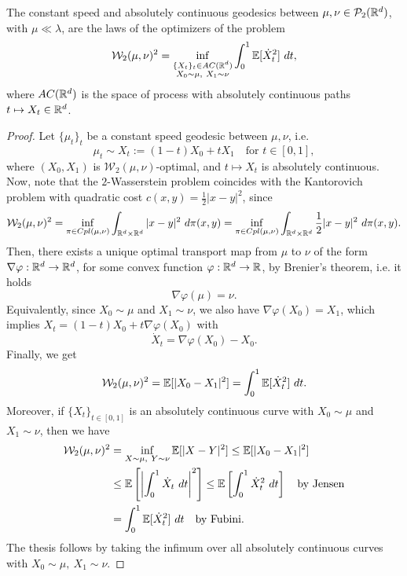 \documentclass[../main.tex]{subfiles}
\begin{document}
\begin{proposition}
    The constant speed and absolutely continuous geodesics between $\mu, \nu\in \mathcal{P}_2(\mathbb{R}^d)$, with $\mu\ll\lambda$, are the laws of the optimizers of the problem 
    $$
    \mathcal{W}_2(\mu, \nu)^2 = \inf_{\substack{\{X_t\}_t\in AC(\mathbb{R}^d) \\ X_0 \sim\mu, \ X_1\sim\nu}} \int_0^1 \mathbb{E}[\dot X_t^2] \ dt,
    $$
    where $AC(\mathbb{R}^d)$ is the space of process with absolutely continuous paths $t\mapsto X_t\in\mathbb{R}^d$. 
\end{proposition}
\begin{proof}
    Let $\{\mu_t\}_t$ be a constant speed geodesic between $\mu, \nu$, i.e.
    $$
    \mu_t \sim X_t := (1-t)X_0 + tX_1 \quad \text{for } t\in[0,1],
    $$
    where $(X_0, X_1)$ is $\mathcal{W}_2(\mu, \nu)$-optimal, and $t\mapsto X_t$ is absolutely continuous. \\
    Now, note that the $2$-Wasserstein problem coincides with the Kantorovich problem with quadratic cost $c(x, y) = \frac{1}{2}|x-y|^2$, since
    $$
    \mathcal{W}_2(\mu, \nu)^2 = \inf_{\pi\in Cpl(\mu, \nu)} \int_{\R^d\times\R^d} |x-y|^2 \ d\pi(x, y) = \inf_{\pi\in Cpl(\mu, \nu)} \int_{\R^d\times\R^d} \frac{1}{2}|x-y|^2 \ d\pi(x, y).
    $$
    Then, there exists a unique optimal transport map from $\mu$ to $\nu$ of the form $\nabla\varphi: \mathbb{R}^d \to \mathbb{R}^d$, for some convex function $\varphi: \mathbb{R}^d\to\mathbb{R}$, by Brenier's theorem, i.e. it holds $$\nabla\varphi(\mu) = \nu.$$
    Equivalently, since $X_0\sim\mu$ and $X_1\sim\nu$, we also have $\nabla\varphi(X_0) = X_1$, which implies $X_t = (1-t)X_0 +t\nabla\varphi(X_0)$ with $$\dot X_t = \nabla\varphi(X_0) - X_0.$$
    Finally, we get
    $$
    \mathcal{W}_2(\mu, \nu)^2 = \mathbb{E}[|X_0 - X_1|^2] =\int_0^1 \mathbb{E}[\dot X_t^2] \ dt.
    $$
    Moreover, if $\{X_t\}_{t\in[0,1]}$ is an absolutely continuous curve with $X_0\sim\mu$ and $X_1\sim\nu$, then we have
    \begin{align*}
        \mathcal{W}_2(\mu, \nu)^2 
        &= \inf_{X\sim\mu,\ Y\sim\nu} \mathbb{E}[|X-Y|^2]
        \leq \mathbb{E}[|X_0 - X_1|^2] \\
        &\leq \mathbb{E}\left[\left|\int_0^1 \dot X_t \ dt\right|^2\right]
        \leq \mathbb{E}\left[\int_0^1 \dot X_t^2 \ dt\right] \quad \text{by Jensen}\\
        &= \int_0^1 \mathbb{E}[\dot X_t^2] \ dt \quad  \text{by Fubini}.
    \end{align*}
    The thesis follows by taking the infimum over all absolutely continuous curves with $X_0\sim\mu, \ X_1\sim\nu$.
\end{proof}
\end{document}
